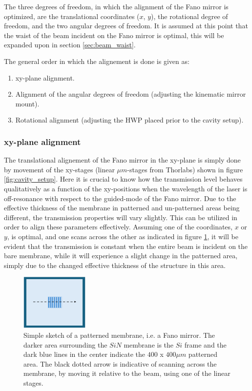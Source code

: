 The three degrees of freedom, in which the alignment of the Fano mirror is optimized, are the translational coordinates ($x$, $y$), the rotational degree of freedom, and the two angular degrees of freedom. It is assumed at this point that the waist of the beam incident on the Fano mirror is optimal, this will be expanded upon in section \ref{sec:beam_waist}.

The general order in which the alignement is done is given as:
\begin{enumerate}
    \item xy-plane alignment. 
    \item Alignment of the angular degrees of freedom (adjusting the kinematic mirror mount).
    \item Rotational alignment (adjusting the HWP placed prior to the cavity setup).
\end{enumerate}

\subsubsection*{xy-plane alignment}
The translational alignement of the Fano mirror in the xy-plane is simply done by movement of the xy-stages (linear $\mu m$-stages from Thorlabs) shown in figure \ref{fig:cavity_setup}. Here it is crucial to know how the transmission level behaves qualitatively as a function of the xy-positions when the wavelength of the laser is off-resonance with respect to the guided-mode of the Fano mirror. Due to the effective thickness of the membrane in patterned and un-patterned areas being different, the transmission properties will vary slightly. This can be utilized in order to align these parameters effectively. Assuming one of the coordinates, $x$ or $y$, is optimal, and one scans across the other as indicated in figure \ref{fig:xy_alignment_sketch}, it will be evident that the transmission is constant when the entire beam is incident on the bare membrane, while it will experience a slight change in the patterned area, simply due to the changed effective thickness of the structure in this area. 

\begin{figure}[h!]
    \centering 
    \includegraphics[width=0.3\textwidth]{figures/xy_alignment_sketch.pdf}
    \caption{Simple sketch of a patterned membrane, i.e. a Fano mirror. The darker area surrounding the $SiN$ membrane is the $Si$ frame and the dark blue lines in the center indicate the $400$ x $400 \mu m$ patterned area. The black dotted arrow is indicative of scanning across the membrane, by moving it relative to the beam, using one of the linear stages.}
    \label{fig:xy_alignment_sketch}
\end{figure}

